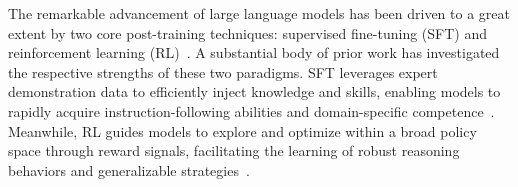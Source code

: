 The remarkable advancement of large language models has been driven to a great extent by two core post-training techniques: supervised fine-tuning (SFT) and reinforcement learning (RL)~\cite{guo2025deepseek, xu2025qwen2}.
A substantial body of prior work has investigated the respective strengths of these two paradigms.
SFT leverages expert demonstration data to efficiently inject knowledge and skills, enabling models to rapidly acquire instruction-following abilities and domain-specific competence~\cite{chu2025sft, chung2024scaling}.
Meanwhile, RL guides models to explore and optimize within a broad policy space through reward signals, facilitating the learning of robust reasoning behaviors and generalizable strategies~\cite{guo2025deepseek,wang2024math}.



